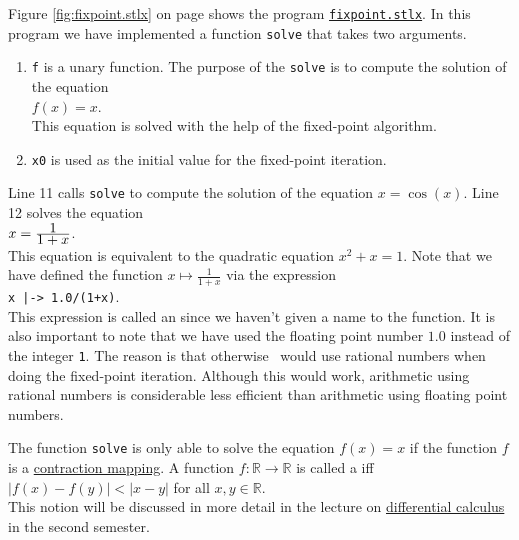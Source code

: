 Figure \ref{fig:fixpoint.stlx} on page \pageref{fig:fixpoint.stlx} shows the program
\href{https://github.com/karlstroetmann/Logik/blob/master/SetlX/fixpoint.stlx}{\texttt{fixpoint.stlx}}.
In this program we have implemented a function \texttt{solve} that takes two arguments.
\begin{enumerate}
\item \texttt{f} is a unary function.  The purpose of the \texttt{solve} is to compute the solution of the equation
      \\[0.2cm]
      \hspace*{1.3cm}
      $f(x) = x$.
      \\[0.2cm]
      This equation is solved with the help of the fixed-point algorithm.
\item \texttt{x0} is used as the initial value for the fixed-point iteration.
\end{enumerate}
Line 11 calls \texttt{solve} to compute the solution of the equation $x = \cos(x)$.
Line 12 solves the equation 
\\[0.2cm]
\hspace*{1.3cm}
$x = \frac{\displaystyle1}{\displaystyle 1+x}$. 
\\[0.2cm]
This equation is equivalent to the quadratic equation $x^2 + x = 1$.  Note that we have defined the function
 $x \mapsto \frac{1}{1+x}$ via the expression
\\[0.2cm]
\hspace*{1.3cm}
\texttt{x |-> 1.0/(1+x)}.
\\[0.2cm]
This expression is called an  since we haven't given a name to the function.  It is
also important to note that we have used the floating point number  $1.0$ instead of the integer \texttt{1}.
The reason is that otherwise \setlx\ would use rational numbers when doing the fixed-point iteration.  Although this would
work, arithmetic using rational numbers is considerable less efficient than arithmetic using floating point
numbers. 

\remarkEng
The function \texttt{solve} is only able to solve the equation $f(x) = x$ if the function $f$ is a 
\href{https://en.wikipedia.org/wiki/Contraction_mapping}{contraction mapping}.  A function 
$f:\mathbb{R} \rightarrow \mathbb{R}$
is called a  iff 
\\[0.2cm]
\hspace*{1.3cm}
$|f(x) - f(y)| < |x - y|$ \quad for all $x,y \in \mathbb{R}$.
\\[0.2cm]
This notion will be discussed in more detail in the lecture on 
\href{https://github.com/karlstroetmann/Analysis/blob/master/Script/analysis.pdf}{differential
  calculus} in the second semester. \eox 

